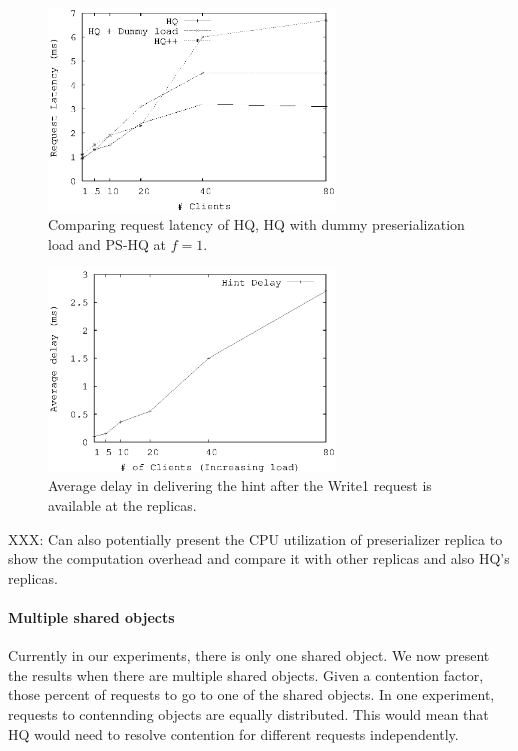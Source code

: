 \documentclass[twocolumn,10pt]{article}
\begin{document}
\begin{figure}
\centering
\includegraphics[width=3.0in]{temp-Figures/Latency-compare.ps}
\caption{Comparing request latency of HQ, HQ with dummy preserialization load and  PS-HQ 
at $f=1$.}
\label{fig:latency-f-1}
\end{figure}



\begin{figure}
\centering
\includegraphics[width=3.0in]{temp-Figures/Hint_Delivery_Delay.ps}
\caption{Average delay in delivering the hint after the Write1 request is available at the
replicas.}
\label{fig:delay_hint}
\end{figure}


XXX: Can also potentially present the CPU utilization of preserializer replica to show the 
computation overhead and compare
it with other replicas and also HQ's replicas.

\paragraph{Multiple shared objects} Currently in our experiments, there is only one shared object. 
We now present the results when there are multiple shared objects. Given a contention factor, those
percent of requests to go to one of the shared objects. In one experiment, requests to contennding
objects are equally distributed. This would mean that HQ would need to resolve contention for different
requests independently. 
\end{document}
